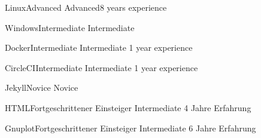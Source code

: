 \documentclass[a4paper,10pt]{cv}
\begin{document}
      \vspace{-1.8em}
      \begin{multicols}{2}
        \begin{cvSkillItem}{Linux}{Advanced}
          Advanced\hfill 8 years experience
        \end{cvSkillItem}
        \begin{cvSkillItem}{Windows}{Intermediate}
          Intermediate
        \end{cvSkillItem}
        \begin{cvSkillItem}{Docker}{Intermediate}
          Intermediate \hfill 1 year experience
        \end{cvSkillItem}
        \begin{cvSkillItem}{CircleCI}{Intermediate}
          Intermediate \hfill 1 year experience
        \end{cvSkillItem}
        \begin{cvSkillItem}{Jekyll}{Novice}
          Novice
        \end{cvSkillItem}
        \begin{cvSkillItem}{HTML}{Fortgeschrittener Einsteiger}
          Intermediate \hfill 4 Jahre Erfahrung
        \end{cvSkillItem}
        \begin{cvSkillItem}{Gnuplot}{Fortgeschrittener Einsteiger}
          Intermediate \hfill 6 Jahre Erfahrung
        \end{cvSkillItem}
      \end{multicols}
\end{document}
